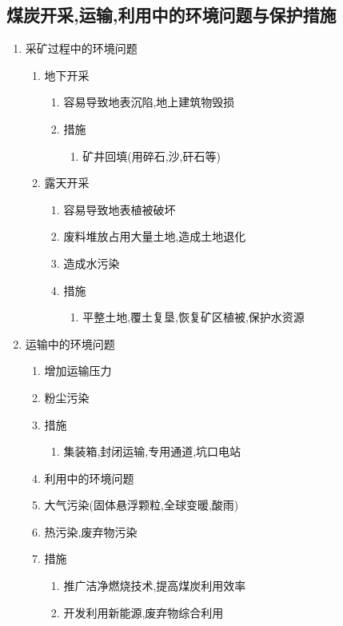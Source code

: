 \documentclass[a4paper]{article}
\begin{document}
    \subsection{煤炭开采,运输,利用中的环境问题与保护措施}
    \begin{enumerate}
        \item 采矿过程中的环境问题
        \begin{enumerate}
            \item 地下开采
            \begin{enumerate}
                \item 容易导致地表沉陷,地上建筑物毁损
                \item 措施
                \begin{enumerate}
                    \item 矿井回填(用碎石,沙,矸石等)
                \end{enumerate}
            \end{enumerate}
            \item 露天开采
            \begin{enumerate}
                \item 容易导致地表植被破坏
                \item 废料堆放占用大量土地,造成土地退化
                \item 造成水污染
                \item 措施
                \begin{enumerate}
                    \item 平整土地,覆土复垦,恢复矿区植被,保护水资源
                \end{enumerate}
            \end{enumerate}
        \end{enumerate}
        \item 运输中的环境问题
        \begin{enumerate}
            \item 增加运输压力
            \item 粉尘污染
            \item 措施
            \begin{enumerate}
                \item 集装箱,封闭运输,专用通道,坑口电站
            \end{enumerate}
        \item 利用中的环境问题
            \item 大气污染(固体悬浮颗粒,全球变暖,酸雨)
            \item 热污染,废弃物污染
            \item 措施
            \begin{enumerate}
                \item 推广洁净燃烧技术,提高煤炭利用效率
                \item 开发利用新能源,废弃物综合利用
            \end{enumerate}
        \end{enumerate}
    \end{enumerate}
\end{document}
